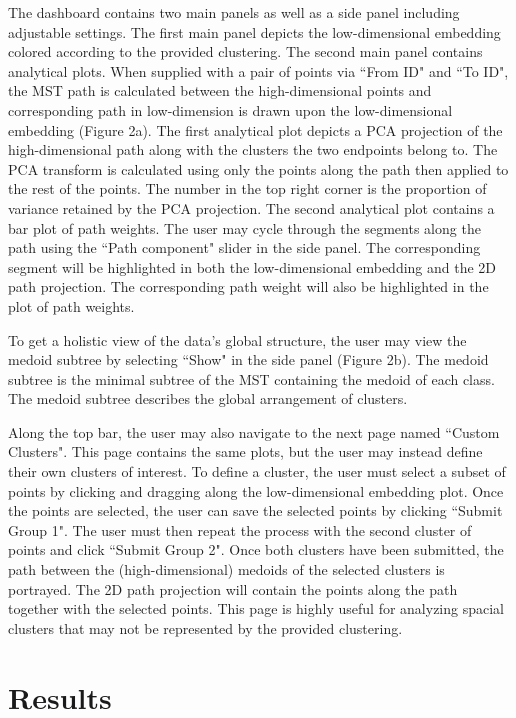 \documentclass{article}
\begin{document}
The dashboard contains two main panels as well as a side panel including adjustable settings. The first main panel depicts the low-dimensional embedding colored according to the provided clustering. The second main panel contains analytical plots. When supplied with a pair of points via ``From ID" and ``To ID", the MST path is calculated between the high-dimensional points and corresponding path in low-dimension is drawn upon the low-dimensional embedding (Figure 2a). The first analytical plot depicts a PCA projection of the high-dimensional path along with the clusters the two endpoints belong to. The PCA transform is calculated using only the points along the path then applied to the rest of the points. The number in the top right corner is the proportion of variance retained by the PCA projection. The second analytical plot contains a bar plot of path weights. The user may cycle through the segments along the path using the ``Path component" slider in the side panel. The corresponding segment will be highlighted in both the low-dimensional embedding and the 2D path projection. The corresponding path weight will also be highlighted in the plot of path weights.

To get a holistic view of the data's global structure, the user may view the medoid subtree by selecting ``Show" in the side panel (Figure 2b). The medoid subtree is the minimal subtree of the MST containing the medoid of each class. The medoid subtree describes the global arrangement of clusters.

Along the top bar, the user may also navigate to the next page named ``Custom Clusters". This page contains the same plots, but the user may instead define their own clusters of interest. To define a cluster, the user must select a subset of points by clicking and dragging along the low-dimensional embedding plot. Once the points are selected, the user can save the selected points by clicking ``Submit Group 1". The user must then repeat the process with the second cluster of points and click ``Submit Group 2". Once both clusters have been submitted, the path between the (high-dimensional) medoids of the selected clusters is portrayed. The 2D path projection will contain the points along the path together with the selected points. This page is highly useful for analyzing spacial clusters that may not be represented by the provided clustering.

\section{Results}
\end{document}
